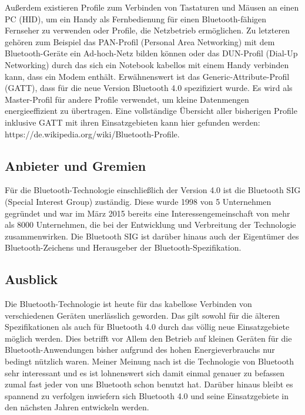 \begin{multicols}{3}
Außerdem existieren Profile zum Verbinden von Tastaturen und Mäusen an einen PC (HID), um ein Handy als Fernbedienung für einen Bluetooth-fähigen Fernseher zu verwenden oder Profile, die Netzbetrieb ermöglichen. Zu letzteren gehören zum Beispiel das PAN-Profil (Personal Area Networking) mit dem Bluetooth-Geräte ein Ad-hoch-Netz bilden können oder das DUN-Profil (Dial-Up Networking) durch das sich ein Notebook kabellos mit einem Handy verbinden kann, dass ein Modem enthält. Erwähnenswert ist das Generic-Attribute-Profil (GATT), dass für die neue Version Bluetooth 4.0 spezifiziert wurde. Es wird als Master-Profil für andere Profile verwendet, um kleine Datenmengen energieeffizient zu übertragen. \cite{Bluetooth_4.2} Eine vollständige Übersicht aller bisherigen Profile inklusive GATT mit ihren Einsatzgebieten kann hier gefunden werden: https://de.wikipedia.org/wiki/Bluetooth-Profile.

\subsection*{Anbieter und Gremien}
Für die Bluetooth-Technologie einschließlich der Version 4.0 ist die Bluetooth SIG (Special Interest Group) zuständig. Diese wurde 1998 von 5 Unternehmen gegründet und war im März 2015 bereits eine Interessengemeinschaft von mehr als 8000 Unternehmen, die bei der Entwicklung und Verbreitung der Technologie zusammenwirken. Die Bluetooth SIG ist darüber hinaus auch der Eigentümer des Bluetooth-Zeichens und Herausgeber der Bluetooth-Spezifikation.\cite{Bluetooth_4.4}

\subsection*{Ausblick}
Die Bluetooth-Technologie ist heute für das kabellose 
Verbinden von verschiedenen Geräten unerlässlich geworden. 
Das gilt sowohl für die älteren Spezifikationen als auch für 
Bluetooth 4.0 durch das völlig neue Einsatzgebiete möglich werden. 
Dies betrifft vor Allem den Betrieb auf kleinen Geräten für die 
Bluetooth-Anwendungen bisher aufgrund des hohen Energieverbrauchs
nur bedingt nützlich waren. Meiner Meinung nach ist die Technologie
von Bluetooth sehr interessant und es ist lohnenswert sich damit einmal
genauer zu befassen zumal fast jeder von uns Bluetooth schon benutzt hat. 
Darüber hinaus bleibt es spannend zu verfolgen inwiefern sich Bluetooth 4.0 
und seine Einsatzgebiete in den nächsten Jahren entwickeln werden.
\printbibliography[segment=3,heading=subbibliography]
\end{multicols}

\newpage
